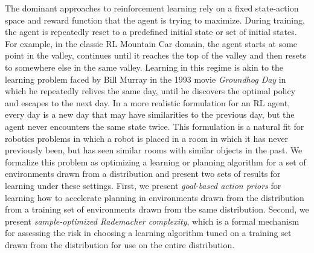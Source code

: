 The dominant approaches to reinforcement learning rely on a fixed
state-action space and reward function that the agent is trying to
maximize.  During training, the agent is repeatedly reset to a
predefined initial state or set of initial states.  For example, in
the classic RL Mountain Car domain, the agent starts at some point in
the valley, continues until it reaches the top of the valley and then
resets to somewhere else in the same valley. Learning in this regime
is akin to the learning problem faced by Bill Murray in the 1993 movie
{\em Groundhog Day} in which he repeatedly relives the same day, until
he discovers the optimal policy and escapes to the next day.  In a
more realistic formulation for an RL agent, every day is a new day
that may have similarities to the previous day, but the agent never
encounters the same state twice.  This formulation is a natural fit
for robotics problems in which a robot is placed in a room in which it
has never previously been, but has seen similar rooms with similar
objects in the past. We formalize this problem as optimizing a learning or planning
algorithm for a set of environments drawn from a distribution and present two sets of results
for learning under these settings. First, we present \emph{goal-based action priors} for learning how to accelerate planning in environments drawn from the distribution from a training set of environments drawn from the same distribution. Second, we present \emph{sample-optimized Rademacher complexity}, which is a formal mechanism for assessing the risk in choosing a learning algorithm tuned on a training set drawn from the distribution for use on the entire distribution.

